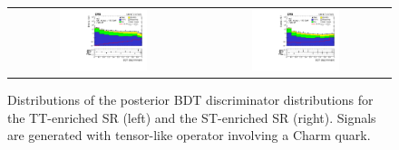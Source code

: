 \begin{figure}[tbh!]
 \begin{center}
 \begin{tabular}{cc}
  \includegraphics[width=0.48\textwidth]{figures/Part3/Results/BDT_TT_TensorC}&
  \includegraphics[width=0.48\textwidth]{figures/Part3/Results/BDT_ST_TensorC}\\
 \end{tabular}
 \caption{Distributions of the posterior BDT discriminator distributions for the TT-enriched SR (left) and the ST-enriched SR (right). Signals are generated with tensor-like operator involving a Charm quark.}
 \label{fig:bdt_postfit_TensorC}
 \end{center}
\end{figure} 


